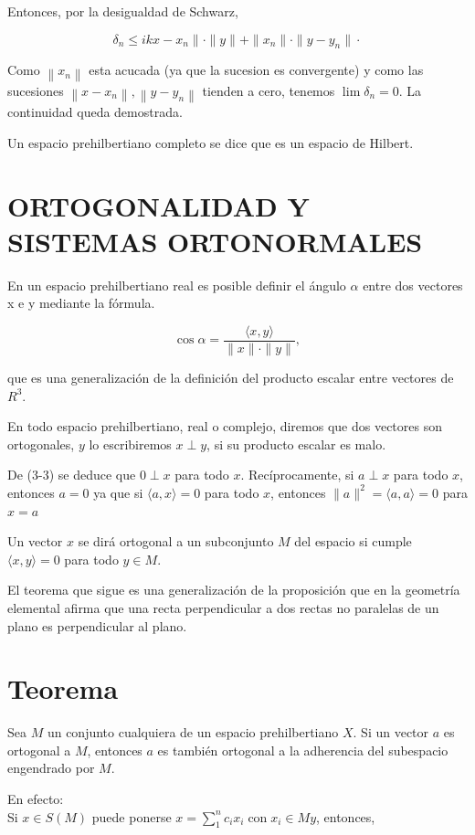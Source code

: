 \documentclass[10pt]{article}
\theoremstyle{plain}
\theoremstyle{definition}
\theoremstyle{remark}
\begin{document}
Entonces, por la desigualdad de Schwarz,

$$
\delta_{n} \leqslant i k x-x_{n}\|\cdot\| y\|+\| x_{n}\|\cdot\| y-y_{n} \| \cdot
$$

Como $\left\|x_{n}\right\|$ esta acucada (ya que la sucesion es convergente) y como las sucesiones $\left\|x-x_{n}\right\|,\left\|y-y_{n}\right\|$ tienden a cero, tenemos $\lim \delta_{n}=0$. La continuidad queda demostrada.

Un espacio prehilbertiano completo se dice que es un espacio de Hilbert.

\section*{ORTOGONALIDAD Y SISTEMAS ORTONORMALES}
En un espacio prehilbertiano real es posible definir el ángulo $\alpha$ entre dos vectores x e y mediante la fórmula.


\begin{equation*}
\cos \alpha=\frac{\langle x, y\rangle}{\|x\| \cdot\|y\|}, \tag{3-5}
\end{equation*}


que es una generalización de la definición del producto escalar entre vectores de $R^{3}$.


En todo espacio prehilbertiano, real o complejo, diremos que dos vectores son ortogonales, $y$ lo escribiremos $x \perp y$, si su producto escalar es malo.

De (3-3) se deduce que $0 \perp x$ para todo $x$. Recíprocamente, si $a \perp x$ para todo $x$, entonces $a=0$ ya que si $\langle a, x\rangle=0$ para todo $x$, entonces $\|a\|^{2}=\langle a, a\rangle=0$ para $x=a$

Un vector $x$ se dirá ortogonal a un subconjunto $M$ del espacio si cumple $\langle x, y\rangle=0$ para todo $y \in M$.

El teorema que sigue es una generalización de la proposición que en la geometría elemental afirma que una recta perpendicular a dos rectas no paralelas de un plano es perpendicular al plano.

\section*{Teorema}
Sea $M$ un conjunto cualquiera de un espacio prehilbertiano $X$. Si un vector $a$ es ortogonal a $M$, entonces $a$ es también ortogonal a la adherencia del subespacio engendrado por $M$.

En efecto:\\
Si $x \in S(M)$ puede ponerse $x=\sum_{1}^{n} c_{i} x_{i} \operatorname{con} x_{i} \in M y$, entonces,
\end{document}
